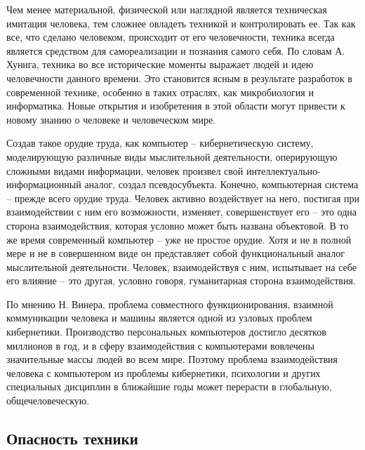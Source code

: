 Чем менее материальной, физической или наглядной является техническая имитация 
человека, тем сложнее овладеть техникой и контролировать ее. Так как все, что 
сделано человеком, происходит от его человечности, техника всегда является 
средством для самореализации и познания самого себя. По словам А. Хунига, 
техника во все исторические моменты выражает людей и идею человечности данного 
времени. Это становится ясным в результате разработок в современной технике, 
особенно в таких отраслях, как микробиология и информатика. Новые открытия и 
изобретения в этой области могут привести к новому знанию о человеке и 
человеческом мире.

Создав такое орудие труда, как компьютер -- кибернетическую систему, 
моделирующую различные виды мыслительной деятельности, оперирующую сложными 
видами информации, человек произвел свой интеллектуально-
информационный аналог, создал псевдосубъекта. Конечно, компьютерная система -- 
прежде всего орудие труда. Человек активно воздействует на него, постигая при 
взаимодействии с ним его возможности, изменяет, совершенствует его -- это одна 
сторона взаимодействия, которая условно может быть названа объектовой. В то же 
время современный компьютер -- уже не простое орудие. Хотя и не в полной мере 
и не в совершенном виде он представляет собой функциональный аналог 
мыслительной деятельности. Человек, взаимодействуя с ним, испытывает на себе 
его влияние -- это другая, условно говоря, гуманитарная сторона взаимодействия.

По мнению Н. Винера, проблема совместного функционирования, взаимной 
коммуникации человека и машины является одной из узловых проблем кибернетики. 
Производство персональных компьютеров достигло десятков миллионов в год, и в 
сферу взаимодействия с компьютерами вовлечены значительные массы людей во всем 
мире. Поэтому проблема взаимодействия человека с компьютером из проблемы 
кибернетики, психологии и других специальных дисциплин в ближайшие годы может 
перерасти в глобальную, общечеловеческую.\cite{net:02}

\subsection{Опасность техники}

